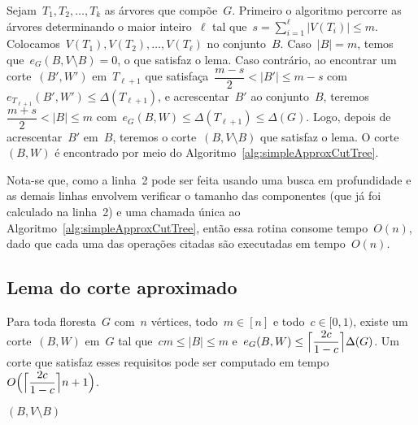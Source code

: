 	Sejam~${T_1, T_2, \ldots,T_k}$ as árvores que compõe~$G$. 
	Primeiro o algoritmo percorre as árvores determinando
	o maior inteiro~$\ell$ tal 
	que~${s=\displaystyle\sum_{i=1}^{\ell}|V(T_i)| \le m}$.
	Colocamos~${V(T_1),V(T_2), \ldots,V(T_\ell)}$ no conjunto~$B$.
	Caso~${|B|=m}$, temos que~${e_G(B,V\setminus B)=0}$, o que 
	satisfaz o lema.
	Caso contrário, ao encontrar um corte~$(B',W')$ em~$T_{\ell+1}$
	que satisfaça~${\dfrac{m-s}{2}<|B'|\le m-s}$ 
	com~${e_{T_{\ell+1}}(B',W') \le \Delta(T_{\ell+1})}$, e 
	acrescentar~$B'$ ao conjunto~$B$, 
	teremos~${\dfrac{m+s}{2}<|B| \le m}$ 
	com~${e_G(B,W)\le\Delta(T_{\ell+1}) \le \Delta(G)}$.
	Logo, depois de acrescentar~$B'$ em~$B$, teremos o 
	corte~${(B,V\setminus B)}$ que satisfaz o lema.
	O corte~$(B,W)$ é encontrado por meio do 
	Algoritmo~\ref{alg:simpleApproxCutTree}.

	
	Nota-se que, como a linha~2 pode ser feita usando uma busca em 
	profundidade e as demais linhas envolvem verificar o tamanho 
	das componentes (que já foi calculado na linha~2) e uma 
	chamada única ao Algoritmo~\ref{alg:simpleApproxCutTree}, então 
	essa rotina consome tempo~$O(n)$, dado que cada uma 
	das operações citadas são executadas em tempo~$O(n)$. 

\bigskip
\bigskip
\bigskip



\subsection{Lema do corte aproximado}

\begin{lem}
\label{lema:approxCutForest}
	Para toda floresta~$G$ com~$n$ vértices, todo~${m \in [n]}$ e 
	todo~${c \in [0,1)}$, existe um corte~$(B,W)$ em~$G$ tal 
	que~${cm \le |B| \le m}$ 
	e~${e_G(B,W) \le \ceil[\Big]{ \dfrac{2c}{1-c}} \Delta(G)}$.
	Um corte que satisfaz esses requisitos pode ser computado em
	tempo~${O\Big(\ceil[\Big]{ \dfrac{2c}{1-c}} n+1\Big)}$.
\end{lem}

\medskip
\medskip

\begin{algorithm}[H]
\label{alg:approxCutForest}

	\caption{Computa corte aproximado em uma floresta}
	\Return $(B,V\setminus B)$

\end{algorithm}	

